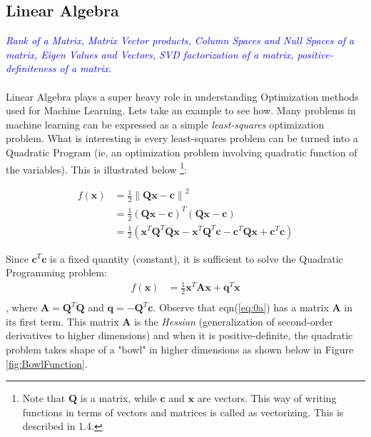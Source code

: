 \documentclass[a4paper]{article}
\begin{document}
\subsection{Linear Algebra}
\textcolor{blue}{\textit{Rank of a Matrix, Matrix Vector products, Column Spaces and Null Spaces of a matrix, Eigen Values and Vectors, SVD factorization of a matrix, positive-definiteness of a matrix}}. \\ \\
Linear Algebra plays a super heavy role in understanding Optimization methods used for Machine Learning. Lets take an example to see how. Many problems in machine learning can be expressed as a simple {\it least-squares} optimization problem. What is interesting is every least-squares problem can be turned into a Quadratic Program (ie, an optimization problem involving quadratic function of the variables). This is illustrated below \footnote{Note that $\mathbf{Q}$ is a matrix, while $\boldsymbol{c}$ and $\boldsymbol{x}$ are vectors. This way of writing functions in terms of vectors and matrices is called as vectorizing. This is described in 1.4.}:

\begin{equation} \label{eq:0}
\begin{split}
f(\boldsymbol{x}) & = \frac{1}{2} \left\lVert \mathbf{Q} \boldsymbol{x} - \boldsymbol{c} \right\lVert ^2 \\
& = \frac{1}{2} (\mathbf{Q} \boldsymbol{x} - \boldsymbol{c})^T  (\mathbf{Q} \boldsymbol{x} - \boldsymbol{c}) \\
& = \frac{1}{2} (\boldsymbol{x}^T \mathbf{Q}^T \mathbf{Q} \boldsymbol{x} - \boldsymbol{x}^T \mathbf{Q}^T \boldsymbol{c} - \boldsymbol{c}^T \mathbf{Q} \boldsymbol{x} + \boldsymbol{c}^T \boldsymbol{c})
\end{split}
\end{equation}

\noindent Since $\boldsymbol{c}^T \boldsymbol{c}$ is a fixed quantity (constant), it is sufficient to solve the Quadratic Programming problem:
\begin{equation} \label{eq:0a}
\begin{split}
f(\boldsymbol{x}) & = \frac{1}{2} \boldsymbol{x}^T \mathbf{A} \boldsymbol{x} + \boldsymbol{q}^T \boldsymbol{x} \\
\end{split}
\end{equation}, where $\mathbf{A} = \mathbf{Q}^T \mathbf{Q}$ and $\boldsymbol{q} = - \mathbf{Q}^T \boldsymbol{c}$. Observe that eqn(\ref{eq:0a}) has a matrix $\mathbf{A}$ in its first term. This matrix $\mathbf{A}$ is the {\it Hessian} (generalization of second-order derivatives to higher dimensions) and when it is positive-definite, the quadratic problem takes shape of a "bowl" in higher dimensions as shown below in Figure \ref{fig:BowlFunction}.
\end{document}
